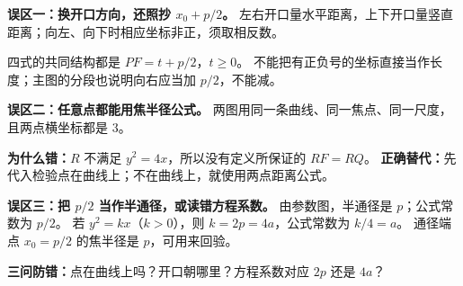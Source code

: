 \clearpage
\begin{trapbox}
\textbf{\textcolor{CTrap}{误区一：换开口方向，还照抄 $x_0+p/2$。}}
左右开口量水平距离，上下开口量竖直距离；向左、向下时相应坐标非正，须取相反数。
\begin{center}\end{center}
四式的共同结构都是 $PF=t+p/2$，$t\ge0$。
不能把有正负号的坐标直接当作长度；主图的分段也说明向右应当加 $p/2$，不能减。
\end{trapbox}
\clearpage
\begin{trapbox}
\textbf{\textcolor{CTrap}{误区二：任意点都能用焦半径公式。}}
两图用同一条曲线、同一焦点、同一尺度，且两点横坐标都是 $3$。
\begin{center}\end{center}
\textbf{为什么错：}$R$ 不满足 $y^2=4x$，所以没有定义所保证的 $RF=RQ$。
\textbf{正确替代：}先代入检验点在曲线上；不在曲线上，就使用两点距离公式。

\medskip
\textbf{\textcolor{CTrap}{误区三：把 $p/2$ 当作半通径，或读错方程系数。}}
由参数图，半通径是 $p$；公式常数为 $p/2$。
若 $y^2=kx$（$k>0$），则 $k=2p=4a$，公式常数为 $k/4=a$。
通径端点 $x_0=p/2$ 的焦半径是 $p$，可用来回验。

\medskip
\textbf{三问防错：}点在曲线上吗？开口朝哪里？方程系数对应 $2p$ 还是 $4a$？
\end{trapbox}
